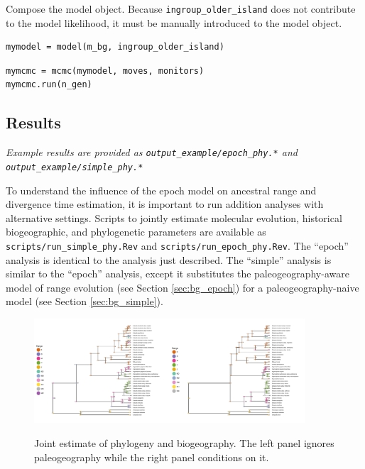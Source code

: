 Compose the model object.
Because {\tt ingroup\_older\_island} does not contribute to the model likelihood, it must be manually introduced to the model object.

\begin{snugshade}
\begin{lstlisting}
mymodel = model(m_bg, ingroup_older_island)
\end{lstlisting}
\end{snugshade}


\begin{snugshade}
\begin{lstlisting}
mymcmc = mcmc(mymodel, moves, monitors)
mymcmc.run(n_gen)
\end{lstlisting}
\end{snugshade}


\subsection*{Results}

{\it Example results are provided as {\tt output\_example/epoch\_phy.*} and {\tt output\_example/simple\_phy.*} }

To understand the influence of the epoch model on ancestral range and divergence time estimation, it is important to run addition analyses with alternative settings.
Scripts to jointly estimate molecular evolution, historical biogeographic, and phylogenetic parameters are available as {\tt scripts/run\_simple\_phy.Rev} and {\tt scripts/run\_epoch\_phy.Rev}.
The ``epoch'' analysis is identical to the analysis just described.
The ``simple'' analysis is similar to the ``epoch'' analysis, except it substitutes the paleogeography-aware model of range evolution (see Section \ref{sec:bg_epoch}) for a paleogeography-naive model (see Section \ref{sec:bg_simple}).

\begin{figure}[!ht]
\centering
\includegraphics[width=0.45\textwidth]{figures/fig_simple_phy_RevGadgets_ase.pdf}\includegraphics[width=0.45\textwidth]{figures/fig_epoch_phy_RevGadgets_ase.pdf} 
\caption{Joint estimate of phylogeny and biogeography. The left panel ignores paleogeography while the right panel conditions on it.}
\label{fig:epoch_phy}
\end{figure}

